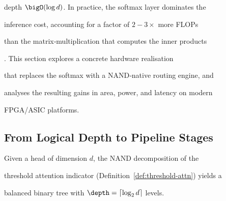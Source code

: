 depth \(\bigO(\log d)\).  In practice, the softmax layer dominates the






inference cost, accounting for a factor of \(2\!-\!3\times\) more FLOPs






than the matrix‑multiplication that computes the inner products






\cite{vaswani2017}.  This section explores a concrete hardware realisation






that replaces the softmax with a NAND‑native routing engine, and






analyses the resulting gains in area, power, and latency on modern






FPGA/ASIC platforms.













\subsection{From Logical Depth to Pipeline Stages}






\label{subsec:pipeline}













Given a head of dimension \(d\), the NAND decomposition of the






threshold attention indicator (Definition~\ref{def:threshold-attn}) yields a






balanced binary tree with \(\depth = \lceil \log_2 d\rceil\) levels.






